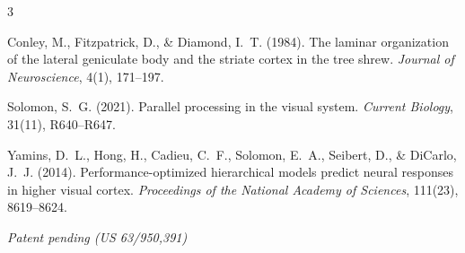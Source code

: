 \documentclass{article}
\begin{document}

\begin{thebibliography}{3}

Conley, M., Fitzpatrick, D., \& Diamond, I.~T. (1984).
\newblock The laminar organization of the lateral geniculate body and the striate cortex in the tree shrew.
\newblock \emph{Journal of Neuroscience}, 4(1), 171--197.

Solomon, S.~G. (2021).
\newblock Parallel processing in the visual system.
\newblock \emph{Current Biology}, 31(11), R640--R647.

Yamins, D.~L., Hong, H., Cadieu, C.~F., Solomon, E.~A., Seibert, D., \& DiCarlo, J.~J. (2014).
\newblock Performance-optimized hierarchical models predict neural responses in higher visual cortex.
\newblock \emph{Proceedings of the National Academy of Sciences}, 111(23), 8619--8624.

\end{thebibliography}

\vspace{1em}
\noindent\textit{Patent pending (US 63/950,391)}
\end{document}
